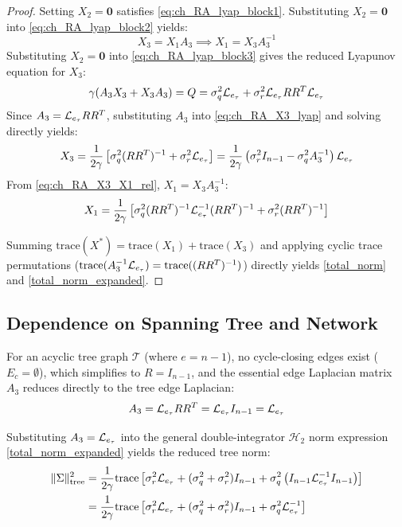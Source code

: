 \begin{proof}
Setting $X_2 = \mathbf{0}$ satisfies \eqref{eq:ch_RA_lyap_block1}. Substituting $X_2 = \mathbf{0}$ into \eqref{eq:ch_RA_lyap_block2} yields:
\begin{equation}\label{eq:ch_RA_X3_X1_rel}
	X_3 = X_1 A_3 \implies X_1 = X_3 A_3^{-1}
\end{equation}
Substituting $X_2 = \mathbf{0}$ into \eqref{eq:ch_RA_lyap_block3} gives the reduced Lyapunov equation for $X_3$:
\begin{equation}\label{eq:ch_RA_X3_lyap}
	\gamma (A_3 X_3 + X_3 A_3) = Q = \sigma_q^2 \mathcal{L}_{e_{\tau}} + \sigma_r^2 \mathcal{L}_{e_{\tau}} R R^T \mathcal{L}_{e_{\tau}}
\end{equation}
Since $A_3 = \mathcal{L}_{e_{\tau}} R R^T$, substituting $A_3$ into \eqref{eq:ch_RA_X3_lyap} and solving directly yields:
\begin{equation}\label{eq:ch_RA_X3_explicit}
	X_3 = \frac{1}{2\gamma} \left[ \sigma_q^2 (R R^T)^{-1} + \sigma_r^2 \mathcal{L}_{e_{\tau}} \right] = \frac{1}{2\gamma} \left( \sigma_r^2 I_{n-1} - \sigma_q^2 A_3^{-1} \right) \mathcal{L}_{e_{\tau}}
\end{equation}
From \eqref{eq:ch_RA_X3_X1_rel}, $X_1 = X_3 A_3^{-1}$:
\begin{equation}\label{eq:ch_RA_X1_explicit}
	X_1 = \frac{1}{2\gamma} \left[ \sigma_q^2 (R R^T)^{-1} \mathcal{L}_{e_{\tau}}^{-1} (R R^T)^{-1} + \sigma_r^2 (R R^T)^{-1} \right]
\end{equation}

Summing $\text{trace}(X^*) = \text{trace}(X_1) + \text{trace}(X_3)$ and applying cyclic trace permutations ($\text{trace}(A_3^{-1} \mathcal{L}_{e_{\tau}}) = \text{trace}((RR^T)^{-1})$) directly yields \eqref{total_norm} and \eqref{total_norm_expanded}.
\end{proof}
\subsection{Dependence on Spanning Tree and Network}\label{sec:ch_RA_tree_dependence}
For an acyclic tree graph $\mathcal{T}$ (where $e = n - 1$), no cycle-closing edges exist ($E_c = \emptyset$), which simplifies to $R = I_{n-1}$, and the essential edge Laplacian matrix $A_3$ reduces directly to the tree edge Laplacian:
\begin{equation}
	A_3 = \mathcal{L}_{e_{\tau}} R R^T = \mathcal{L}_{e_{\tau}} I_{n-1} = \mathcal{L}_{e_{\tau}}
\end{equation}

Substituting $A_3 = \mathcal{L}_{e_{\tau}}$ into the general double-integrator $\mathcal{H}_2$ norm expression \eqref{total_norm_expanded} yields the reduced tree norm:
\begin{align}\label{eq:ch_RA_tree_norm_expanded_proof}
	\|\Sigma\|_{\text{tree}}^2 &= \frac{1}{2\gamma} \text{trace}\left[ \sigma_r^2 \mathcal{L}_{e_{\tau}} + (\sigma_q^2 + \sigma_r^2) I_{n-1} + \sigma_q^2 \left( I_{n-1} \mathcal{L}_{e_{\tau}}^{-1} I_{n-1} \right) \right] \nonumber \\
	&= \frac{1}{2\gamma} \text{trace}\left[ \sigma_r^2 \mathcal{L}_{e_{\tau}} + (\sigma_q^2 + \sigma_r^2) I_{n-1} + \sigma_q^2 \mathcal{L}_{e_{\tau}}^{-1} \right]
\end{align}

